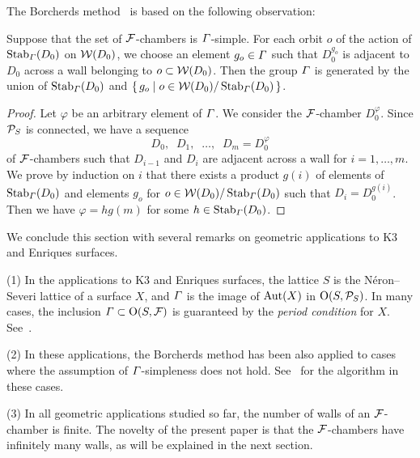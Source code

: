 \documentclass{amsart} %
\begin{document}
\par
The Borcherds method~\cite{MR913200, MR1654763} is 
based on the following observation:
%
\begin{proposition}\label{prop:observation}
Suppose that the set of $\mathord{\mathcal{F}}$-chambers is $\varGamma$-simple.
For each orbit $o$ of the action of $\operatorname{Stab}_{\varGamma}(D_0)$ on $\mathord{\mathcal{W}}(D_0)$,
we choose an element $g_o\in \varGamma$ such that
$D_0^{g_o}$ is adjacent to $D_0$ across a wall
belonging to $o\subset \mathord{\mathcal{W}}(D_0)$.
Then the group $\varGamma$ is generated by the union of 
$\operatorname{Stab}_{\varGamma}(D_0)$ and $\{\,{g_o}\mid {o\in \mathord{\mathcal{W}}(D_0)/\operatorname{Stab}_{\varGamma}(D_0)} \,\}$.
\end{proposition}
%
\begin{proof}
Let $\varphi$ be an arbitrary element of $\varGamma$.
We consider the $\mathord{\mathcal{F}}$-chamber $D_0^{\varphi}$.
Since $\mathord{\mathcal{P}}_S$ is connected, 
we have a sequence
\[
D_0, \;\; D_1, \;\; \dots, \;\; D_m=D_0^{\varphi}
\]
of $\mathord{\mathcal{F}}$-chambers such that $D_{i-1}$ and $D_i$ are 
adjacent across a wall for $i=1, \dots, m$.
We prove by induction on $i$ that there exists 
a product $g(i)$ of elements of $\operatorname{Stab}_{\varGamma}(D_0)$ and 
 elements $g_o$ for $o\in \mathord{\mathcal{W}}(D_0)/\operatorname{Stab}_{\varGamma}(D_0)$
such that $D_i=D_0^{g(i)}$.
Then we have $\varphi=h g(m) $ for some $h\in \operatorname{Stab}_{\varGamma}(D_0)$.
\end{proof}
%
We conclude this section with several remarks on geometric applications
to K3 and Enriques surfaces. 
%
\begin{remark}\label{rem:geom}
(1) 
In the applications to K3 and Enriques surfaces, 
the lattice $S$ is the N\'eron--Severi lattice of a surface $X$,
and $\varGamma$ is the image of $\operatorname{Aut}(X)$ in $\mathord{\mathrm{O}}(S,\mathord{\mathcal{P}}_S)$.
In many cases, the inclusion
$\varGamma \subset \mathord{\mathrm{O}}(S,\mathord{\mathcal{F}})$
is guaranteed by the \emph{period condition} for $X$.
See~\cite[Section~5.2]{MR4759604}.
\par
(2) 
In these applications, 
the Borcherds method has been also applied to cases where 
the assumption of $\varGamma$-simpleness does not hold.
See~\cite[Section 5.1]{MR4759604} for the algorithm
in these cases.
%
\par
(3) 
In all geometric applications studied so far,
the number of walls of an $\mathord{\mathcal{F}}$-chamber is finite.
The novelty of the present paper is that
the $\mathord{\mathcal{F}}$-chambers have infinitely many walls,
as will be explained in the next section.
\end{remark}
%
%
\end{document}

